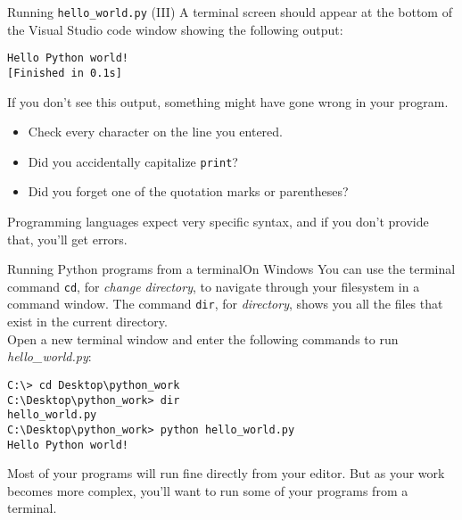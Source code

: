 \documentclass[aspectratio=169]{beamer}
\begin{document}
\begin{frame}[fragile]{Running \texttt{hello\_world.py} (III)}
    A terminal screen should appear at the bottom of the Visual Studio code window showing the following output:
    \vspace{5pt}
    \begin{Verbatim}[fontsize=\footnotesize]
Hello Python world!
[Finished in 0.1s]
    \end{Verbatim}
    \vspace{15pt}
    If you don't see this output, something might have gone wrong in your program.
        \begin{itemize}[label=\(\blacktriangleright\),itemsep=5pt]
            \item Check every character on the line you entered.
            \item Did you accidentally capitalize \texttt{print}?
            \item Did you forget one of the quotation marks or parentheses?\\
        \end{itemize}
    \vspace{15pt}
    Programming languages expect very specific syntax, and if you don't provide that, you'll get errors.
\end{frame}


\begin{frame}[fragile]{Running Python programs from a terminal}{On Windows}
    You can use the terminal command \texttt{cd}, for \textit{change directory}, to navigate through your filesystem in a command window.
    The command \texttt{dir}, for \textit{directory}, shows you all the files that exist in the current directory. \\
    \vspace{10pt}
    Open a new terminal window and enter the following commands to run \textit{hello\_world.py}:
    \vspace{5pt}
    \begin{Verbatim}[fontsize=\footnotesize]
C:\> cd Desktop\python_work
C:\Desktop\python_work> dir
hello_world.py
C:\Desktop\python_work> python hello_world.py
Hello Python world!
    \end{Verbatim}
    \vspace{10pt}
    Most of your programs will run fine directly from your editor.
    But as your work becomes more complex, you'll want to run some of your programs from a terminal.
\end{frame}
\end{document}
